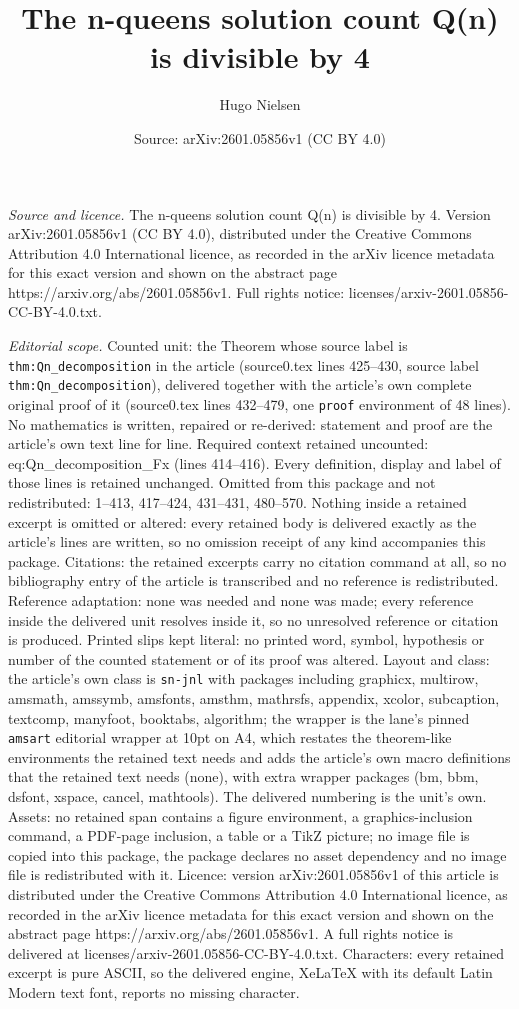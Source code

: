 \documentclass[10pt,a4paper]{amsart}
\title[The n-queens solution count Q(n) is divisible by 4]{The n-queens solution count Q(n) is divisible by 4}
\author{Hugo Nielsen}
\date{Source: arXiv:2601.05856v1 (CC BY 4.0)}
\begin{document}
\maketitle

\noindent\emph{Source and licence.} The n-queens solution count Q(n) is divisible by 4. Version arXiv:2601.05856v1 (CC BY 4.0), distributed under the Creative Commons Attribution 4.0 International licence, as recorded in the arXiv licence metadata for this exact version and shown on the abstract page https://arxiv.org/abs/2601.05856v1. Full rights notice: licenses/arxiv-2601.05856-CC-BY-4.0.txt.\par\smallskip

\noindent\textit{Editorial scope.} Counted unit: the Theorem whose source label is \texttt{thm:Qn\_decomposition} in the article (source0.tex lines 425--430, source label \texttt{thm:Qn\_decomposition}), delivered together with the article's own complete original proof of it (source0.tex lines 432--479, one \texttt{proof} environment of 48 lines). No mathematics is written, repaired or re-derived: statement and proof are the article's own text line for line. Required context retained uncounted: eq:Qn\_decomposition\_Fx (lines 414--416). Every definition, display and label of those lines is retained unchanged. Omitted from this package and not redistributed: 1--413, 417--424, 431--431, 480--570. Nothing inside a retained excerpt is omitted or altered: every retained body is delivered exactly as the article's lines are written, so no omission receipt of any kind accompanies this package. Citations: the retained excerpts carry no citation command at all, so no bibliography entry of the article is transcribed and no reference is redistributed. Reference adaptation: none was needed and none was made; every reference inside the delivered unit resolves inside it, so no unresolved reference or citation is produced. Printed slips kept literal: no printed word, symbol, hypothesis or number of the counted statement or of its proof was altered. Layout and class: the article's own class is \texttt{sn-jnl} with packages including graphicx, multirow, amsmath, amssymb, amsfonts, amsthm, mathrsfs, appendix, xcolor, subcaption, textcomp, manyfoot, booktabs, algorithm; the wrapper is the lane's pinned \texttt{amsart} editorial wrapper at 10pt on A4, which restates the theorem-like environments the retained text needs and adds the article's own macro definitions that the retained text needs (none), with extra wrapper packages (bm, bbm, dsfont, xspace, cancel, mathtools). The delivered numbering is the unit's own. Assets: no retained span contains a figure environment, a graphics-inclusion command, a PDF-page inclusion, a table or a TikZ picture; no image file is copied into this package, the package declares no asset dependency and no image file is redistributed with it. Licence: version arXiv:2601.05856v1 of this article is distributed under the Creative Commons Attribution 4.0 International licence, as recorded in the arXiv licence metadata for this exact version and shown on the abstract page https://arxiv.org/abs/2601.05856v1. A full rights notice is delivered at licenses/arxiv-2601.05856-CC-BY-4.0.txt. Characters: every retained excerpt is pure ASCII, so the delivered engine, XeLaTeX with its default Latin Modern text font, reports no missing character.
\end{document}
